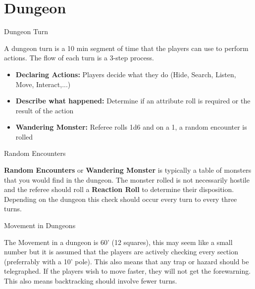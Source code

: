 \section*{Dungeon}
\begin{mercHeading}
Dungeon Turn
\end{mercHeading}
A dungeon turn is a 10 min segment of time that the players can use to perform actions. The flow of each turn is a 3-step process.
\begin{itemize}
\setlength\itemsep{0em}
	\item \textbf{Declaring Actions:} Players decide what they do (Hide, Search, Listen, Move, Interact,...)
	\item \textbf{Describe what happened:} Determine if an attribute roll is required or the result of the action
	\item \textbf{Wandering Monster:} Referee rolls 1d6 and on a 1, a random encounter is rolled
\end{itemize}
\begin{mercHeading}
Random Encounters
\end{mercHeading}
\textbf{Random Encounters} or \textbf{Wandering Monster} is typically a table of monsters that you would find in the dungeon. The monster rolled is not necessarily hostile and the referee should roll a \textbf{Reaction Roll} to determine their disposition. Depending on the dungeon this check should occur every turn to every three turns.

\begin{mercHeading}
Movement in Dungeons
\end{mercHeading}
The Movement in a dungeon is 60' (12 squares), this may seem like a small number but it is assumed that the players are actively checking every section (preferrably with a 10' pole). This also means that any trap or hazard should be telegraphed. If the players wish to move faster, they will not get the forewarning. This also means backtracking should involve fewer turns. 


